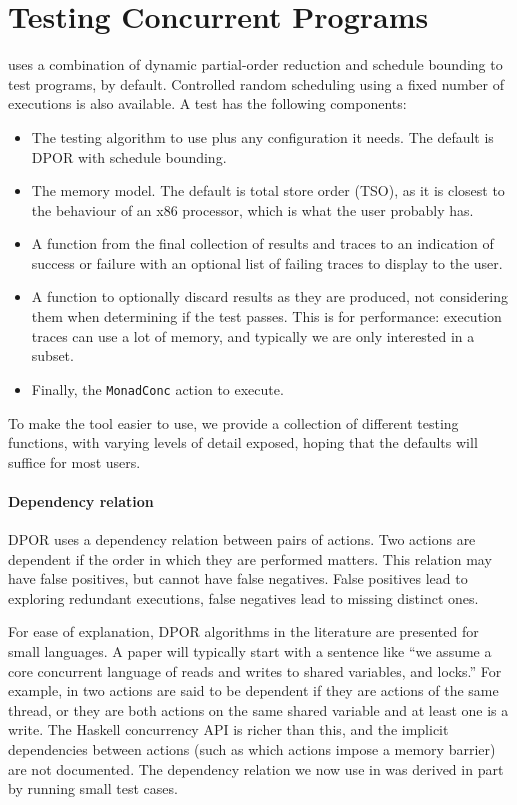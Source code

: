 \FloatBarrier
\section{Testing Concurrent Programs}
\label{sec:dejafu-testing}

\dejafu{} uses a combination of dynamic partial-order reduction and
schedule bounding to test programs, by default.  Controlled random
scheduling using a fixed number of executions is also available.  A
\dejafu{} test has the following components:

\begin{itemize}
\item The testing algorithm to use plus any configuration it needs.
  The default is DPOR with schedule bounding.
\item The memory model.  The default is total store order (TSO), as it
  is closest to the behaviour of an x86 processor\cite{owens2009},
  which is what the user probably has.
\item A function from the final collection of results and traces to an
  indication of success or failure with an optional list of failing
  traces to display to the user.
\item A function to optionally discard results as they are produced,
  not considering them when determining if the test passes.  This is
  for performance: execution traces can use a lot of memory, and
  typically we are only interested in a subset.
\item Finally, the \verb|MonadConc| action to execute.
\end{itemize}

To make the tool easier to use, we provide a collection of different
testing functions, with varying levels of detail exposed, hoping that
the defaults will suffice for most users.

\paragraph{Dependency relation}
DPOR uses a dependency relation between pairs of actions.  Two actions
are dependent if the order in which they are performed matters.  This
relation may have false positives, but cannot have false negatives.
False positives lead to exploring redundant executions, false
negatives lead to missing distinct ones.

For ease of explanation, DPOR algorithms in the literature are
presented for small languages.  A paper will typically start with a
sentence like ``we assume a core concurrent language of reads and
writes to shared variables, and locks.''  For example, in
\cite{coons2013} two actions are said to be dependent if they are
actions of the same thread, or they are both actions on the same
shared variable and at least one is a write.  The Haskell concurrency
API is richer than this, and the implicit dependencies between actions
(such as which actions impose a memory barrier) are not documented.
The dependency relation we now use in \dejafu{} was derived in part by
running small test cases.

